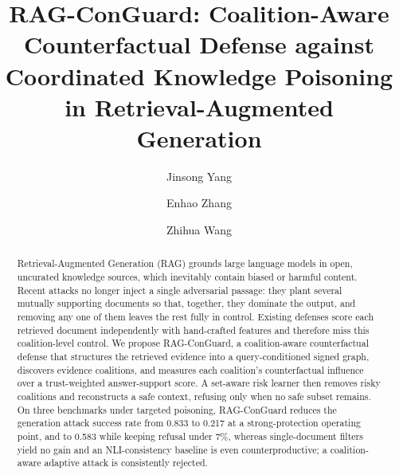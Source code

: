 \documentclass[sigconf]{acmart}
\begin{document}
\title[RAG-ConGuard: Coalition-Aware Counterfactual Defense]{RAG-ConGuard: Coalition-Aware Counterfactual Defense against Coordinated Knowledge Poisoning in Retrieval-Augmented Generation}

\author{Jinsong Yang}

\author{Enhao Zhang}  %

\author{Zhihua Wang}    %
\correspondingauthor   %


\renewcommand{\shortauthors}{Yang et al.}

\begin{abstract}
Retrieval-Augmented Generation (RAG) grounds large language models in open, uncurated knowledge sources, which inevitably contain biased or harmful content. Recent attacks no longer inject a single adversarial passage: they plant several mutually supporting documents so that, together, they dominate the output, and removing any one of them leaves the rest fully in control. Existing defenses score each retrieved document independently with hand-crafted features and therefore miss this coalition-level control. We propose RAG-ConGuard, a coalition-aware counterfactual defense that structures the retrieved evidence into a query-conditioned signed graph, discovers evidence coalitions, and measures each coalition's counterfactual influence over a trust-weighted answer-support score. A set-aware risk learner then removes risky coalitions and reconstructs a safe context, refusing only when no safe subset remains. On three benchmarks under targeted poisoning, RAG-ConGuard reduces the generation attack success rate from 0.833 to 0.217 at a strong-protection operating point, and to 0.583 while keeping refusal under 7\%, whereas single-document filters yield no gain and an NLI-consistency baseline is even counterproductive; a coalition-aware adaptive attack is consistently rejected.
\end{abstract}

\end{document}
